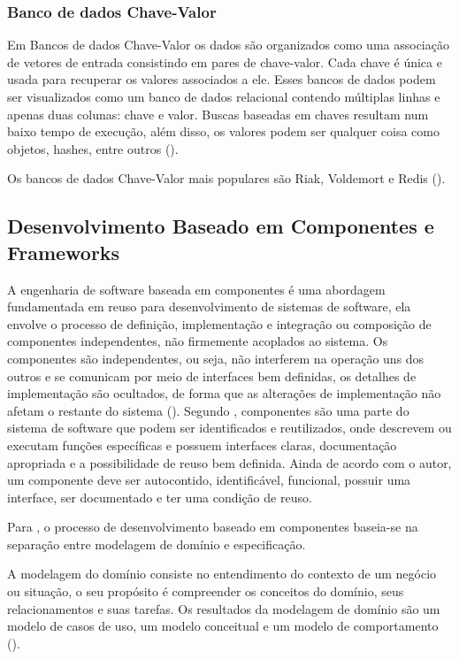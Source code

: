 \subsubsection{Banco de dados Chave-Valor}

Em Bancos de dados Chave-Valor os dados são organizados como uma associação de vetores de entrada consistindo em pares de chave-valor. Cada chave é única e usada para recuperar os valores associados a ele. Esses bancos de dados podem ser visualizados como um banco de dados relacional contendo múltiplas linhas e apenas duas colunas: chave e valor. Buscas baseadas em chaves resultam num baixo tempo de execução, além disso, os valores podem ser qualquer coisa como objetos, hashes, entre outros (\cite{kaur:2013}).

Os bancos de dados Chave-Valor mais populares são Riak, Voldemort e Redis (\cite{kaur:2013}).


\subsection{Desenvolvimento Baseado em Componentes e Frameworks}

A engenharia de software baseada em componentes é uma abordagem fundamentada em reuso para desenvolvimento de sistemas de software, ela envolve o processo de definição, implementação e integração ou composição de componentes independentes, não firmemente acoplados ao sistema. Os componentes são independentes, ou seja, não interferem na operação uns dos outros e se comunicam por meio de interfaces bem definidas, os detalhes de implementação são ocultados, de forma que as alterações de implementação não afetam o restante do sistema (\cite{sommerville:2013}). Segundo \cite{sametinger:1997}, componentes são uma parte do sistema de software que podem ser identificados e reutilizados, onde descrevem ou executam funções específicas e possuem interfaces claras, documentação apropriada e a possibilidade de reuso bem definida. Ainda de acordo com o autor, um componente deve ser autocontido, identificável, funcional, possuir uma interface, ser documentado e ter uma condição de reuso. 

Para \cite{cheesman:2001}, o processo de desenvolvimento baseado em componentes baseia-se na separação entre modelagem de domínio e especificação.

A modelagem do domínio consiste no entendimento do contexto de um negócio ou situação, o seu propósito é compreender os conceitos do domínio, seus relacionamentos e suas tarefas. Os resultados da modelagem de domínio são um modelo de casos de uso, um modelo conceitual e um modelo de comportamento (\cite{itana:2005}).

